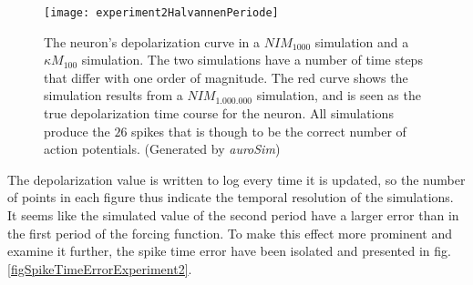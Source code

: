 \begin{figure}[hbt!p]
 	\centering
	\centerline{ %
 		\texttt{[image: experiment2HalvannenPeriode]}
	}
 	\caption[Simulation results of experiment 2: dynamic forcing func.]{
			 	The neuron's depolarization curve in a $NIM_{1000}$ simulation and a $\kappa M_{100}$ simulation.
				The two simulations have a number of time steps that differ with one order of magnitude.
 				The red curve shows the simulation results from a $NIM_{1.000.000}$ simulation, and is seen as the true depolarization time course for the neuron.
				All simulations produce the $26$ spikes that is though to be the correct number of action potentials. %
				(Generated by \emph{auroSim})
			}
 	\label{figExperiment2}
\end{figure}

			The depolarization value is written to log every time it is updated, so the number of points in each figure thus indicate the temporal resolution of the simulations.
			It seems like the simulated value of the second period have a larger error than in the first period of the forcing function.
			To make this effect more prominent and examine it further, the spike time error have been isolated and presented in fig. \ref{figSpikeTimeErrorExperiment2}.

